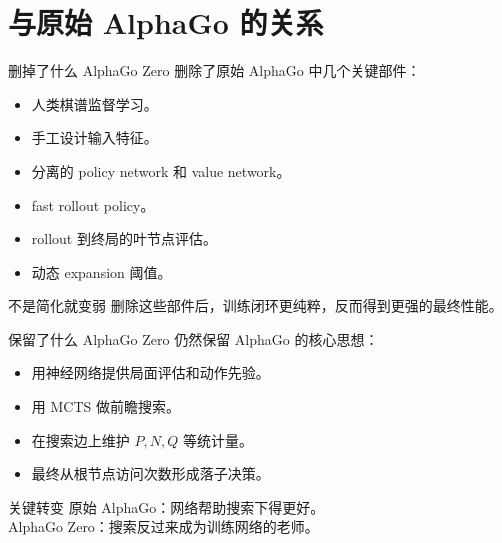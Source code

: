 \documentclass[UTF8,aspectratio=169,10pt]{ctexbeamer}
\begin{document}
\section{与原始 AlphaGo 的关系}

\begin{frame}{删掉了什么}
  AlphaGo Zero 删除了原始 AlphaGo 中几个关键部件：

  \begin{itemize}
    \item 人类棋谱监督学习。
    \item 手工设计输入特征。
    \item 分离的 policy network 和 value network。
    \item fast rollout policy。
    \item rollout 到终局的叶节点评估。
    \item 动态 expansion 阈值。
  \end{itemize}

  \begin{alertblock}{不是简化就变弱}
    删除这些部件后，训练闭环更纯粹，反而得到更强的最终性能。
  \end{alertblock}
\end{frame}

\begin{frame}{保留了什么}
  AlphaGo Zero 仍然保留 AlphaGo 的核心思想：

  \begin{itemize}
    \item 用神经网络提供局面评估和动作先验。
    \item 用 MCTS 做前瞻搜索。
    \item 在搜索边上维护 $P,N,Q$ 等统计量。
    \item 最终从根节点访问次数形成落子决策。
  \end{itemize}

  \begin{block}{关键转变}
    原始 AlphaGo：网络帮助搜索下得更好。\\
    AlphaGo Zero：搜索反过来成为训练网络的老师。
  \end{block}
\end{frame}
\end{document}
